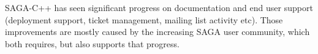 \documentclass[12pt]{article}
\begin{document}
 SAGA-C++ has seen significant progress on documentation and end user
 support (deployment support, ticket management, mailing list activity
 etc).  Those improvements are mostly caused by the increasing SAGA user
 community, which both requires, but also supports that progress.




% 
% 
\end{document}
